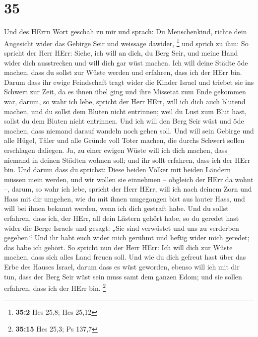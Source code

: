 \hypertarget{section-9}{%
\section{35}\label{section-9}}

 Und des HErrn Wort geschah zu mir und sprach: 
Du Menschenkind, richte dein Angesicht wider das Gebirge Seir und
weissage dawider, \footnote{\textbf{35:2} Hes 25,8; Hes 25,12}
 und sprich zu ihm: So spricht der Herr HErr: Siehe, ich
will an dich, du Berg Seir, und meine Hand wider dich ausstrecken und
will dich gar wüst machen.  Ich will deine Städte öde
machen, dass du sollst zur Wüste werden und erfahren, dass ich der HErr
bin.  Darum dass ihr ewige Feindschaft tragt wider die
Kinder Israel und triebet sie ins Schwert zur Zeit, da es ihnen übel
ging und ihre Missetat zum Ende gekommen war,  darum, so
wahr ich lebe, spricht der Herr HErr, will ich dich auch blutend machen,
und du sollst dem Bluten nicht entrinnen; weil du Lust zum Blut hast,
sollst du dem Bluten nicht entrinnen.  Und ich will den Berg
Seir wüst und öde machen, dass niemand darauf wandeln noch gehen soll.
 Und will sein Gebirge und alle Hügel, Täler und alle Gründe
voll Toter machen, die durchs Schwert sollen erschlagen daliegen.
 Ja, zu einer ewigen Wüste will ich dich machen, dass
niemand in deinen Städten wohnen soll; und ihr sollt erfahren, dass ich
der HErr bin.  Und darum dass du sprichst: Diese beiden
Völker mit beiden Ländern müssen mein werden, und wir wollen sie
einnehmen -- obgleich der HErr da wohnt --,  darum, so wahr
ich lebe, spricht der Herr HErr, will ich nach deinem Zorn und Hass mit
dir umgehen, wie du mit ihnen umgegangen bist aus lauter Hass, und will
bei ihnen bekannt werden, wenn ich dich gestraft habe.  Und
du sollst erfahren, dass ich, der HErr, all dein Lästern gehört habe, so
du geredet hast wider die Berge Israels und gesagt: „Sie sind verwüstet
und uns zu verderben gegeben.``  Und ihr habt euch wider
mich gerühmt und heftig wider mich geredet; das habe ich gehört.
 So spricht nun der Herr HErr: Ich will dich zur Wüste
machen, dass sich alles Land freuen soll.  Und wie du dich
gefreut hast über das Erbe des Hauses Israel, darum dass es wüst
geworden, ebenso will ich mit dir tun, dass der Berg Seir wüst sein muss
samt dem ganzen Edom; und sie sollen erfahren, dass ich der HErr bin.
\footnote{\textbf{35:15} Hes 25,3; Ps 137,7}

